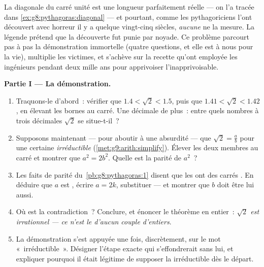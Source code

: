 \begin{problem}
\label{pb:g9:sqrt:1}
La diagonale du carré unité est une longueur parfaitement réelle ---
on l'a tracée dans \cref{ex:g8:pythagoras:diagonal} --- et pourtant,
comme les pythagoriciens l'ont découvert avec horreur il y a quelque
vingt-cinq siècles, \emph{aucune } ne la mesure. La légende
prétend que la découverte fut punie par noyade. Ce problème parcourt
pas à pas la démonstration immortelle (quatre questions, et elle est
à nous pour la vie), multiplie les victimes, et s'achève sur la
recette qu'ont employée les ingénieurs pendant deux mille ans pour
apprivoiser l'inapprivoisable.

\medskip
\noindent\textbf{Partie I --- La démonstration.}
\begin{enumerate}
  \item Traquons-le d'abord~: vérifier que $1.4 < \sqrt2 < 1.5$,
        puis que $1.41 < \sqrt2 < 1.42$, en élevant les bornes au
        carré. Une décimale de plus~: entre quels nombres à trois
        décimales $\sqrt2$ se situe-t-il~?
  \item Supposons maintenant --- pour aboutir à une absurdité ---
        que $\sqrt2 = \frac ab$ pour une certaine 
        \emph{irréductible} (\cref{met:g9:arith:simplify}). Élever
        les deux membres au carré et montrer que $a^2 = 2 b^2$.
        Quelle est la parité de $a^2$~?
  \item Les faits de parité du~\cref{pb:g8:pythagoras:1} disent que
        les  ont des carrés . En déduire que
        $a$ est , écrire $a = 2k$, substituer --- et montrer que
        $b$ doit être  lui aussi.
  \item Où est la contradiction~? Conclure, et énoncer le théorème
        en entier~: \emph{$\sqrt2$ est irrationnel --- ce n'est le
         d'aucun couple d'entiers}.
  \item La démonstration s'est appuyée une fois, discrètement, sur
        le mot «~irréductible~». Désigner l'étape exacte qui
        s'effondrerait sans lui, et expliquer pourquoi il était
        légitime de supposer la  irréductible dès le départ.
\end{enumerate}


\end{problem}
